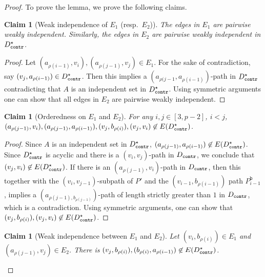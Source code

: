 \documentclass[a4paper,11pt]{article}
\theoremstyle{plain}
\newtheorem{claim}[theorem]{Claim}
\newtheorem{identification rule}{Identification Rule}
\theoremstyle{definition}
\theoremstyle{remark}
\newenvironment{claimproof}{\begin{proof}\renewcommand{\qedsymbol}{\claimqed}}{\end{proof}\renewcommand{\qedsymbol}{\plainqed}}
\let\plainqed\qedsymbol
\newcommand{\claimqed}{$\lrcorner$}
\newcommand{\contr}{\textnormal{\texttt{contr}}}
\newcommand{\Dcontr}{D_{\contr}}
\newcommand{\bbb}{\texttt{b}}
\begin{document}
\begin{proof}
To prove the lemma, we prove the following claims.

\begin{claim}[Weak independence of $E_1$ (resp.~$E_2$)]\label{claim:biclique-long-path-weak}
The edges in $E_1$ are pairwise weakly independent. Similarly, the edges in $E_2$ are pairwise weakly independent in $D^{\star}_{\contr}$.
\end{claim}

\begin{claimproof}
Let $(a_{\rho(i-1)},{v}_{i}), \allowbreak (a_{\rho(j-1)},{v}_{j}) \in E_1$. For the sake of contradiction, say $(v_j, a_{\rho(i-1)}) \in \Dcontr^{\star}$. Then this implies a $(a_{\rho(j-1},a_{\rho(i-1)})$-path in $\Dcontr^{\star}$ contradicting that $A$ is an independent set in $\Dcontr^{\star}$.
Using symmetric arguments one can show that all edges in $E_2$ are pairwise weakly independent.
\end{claimproof}

\begin{claim}[Orderedness on $E_1$ and $E_2$]\label{claim:biclique-long-path-ordered}
For any $i,j \in [3, p-2]$, $i <j$, $(a_{\rho(j-1)}, v_{i}), \allowbreak (a_{\rho(j-1)}, a_{\rho(i-1)}),  \allowbreak ({v}_{j},  \allowbreak b_{\rho(i)}), \allowbreak (v_j,v_i) \not \in E(\Dcontr^{\star})$.
\end{claim}

\begin{claimproof}
Since $A$ is an independent set in $\Dcontr^{\star}$, $(a_{\rho(j-1)}, a_{\rho(i-1)}) \not \in E(\Dcontr^{\star})$. Since $\Dcontr^{\star}$ is acyclic and there is a $(v_i,v_j)$-path in $\Dcontr$, we conclude that $(v_j,v_i) \not \in E(\Dcontr^{\star})$.
If there is an $(a_{\rho(j-1)}, {v}_{i})$-path in $\Dcontr$, then this together with the $( {v}_{i},v_{j-1})$-subpath of $P'$ and the $(v_{i-1},b_{\rho(i-1)})$ path $P^{\bbb}_{i-1}$, implies a $(a_{\rho(j-1),b_{\rho(j-1)}})$-path of length strictly greater than $1$ in $\Dcontr$, which is a contradiction. Using symmetric arguments, one can show that 
$({v}_{j}, b_{\rho(i)}), (v_j,v_i) \not \in E(\Dcontr^{\star})$.
\end{claimproof}

\begin{claim}[Weak independence between $E_1$ and $E_2$]\label{claim:biclique-long-path-weak-between}
Let $(v_i,b_{\rho(i)}) \in E_1$ and $(a_{\rho(j-1)},v_j) \in E_2$.
There is $(v_j,b_{\rho(i)}), (b_{\rho(i)},a_{\rho(i-1)}) \not \in E(\Dcontr^{\star})$. 
\end{claim}


\end{proof}
\end{document}
